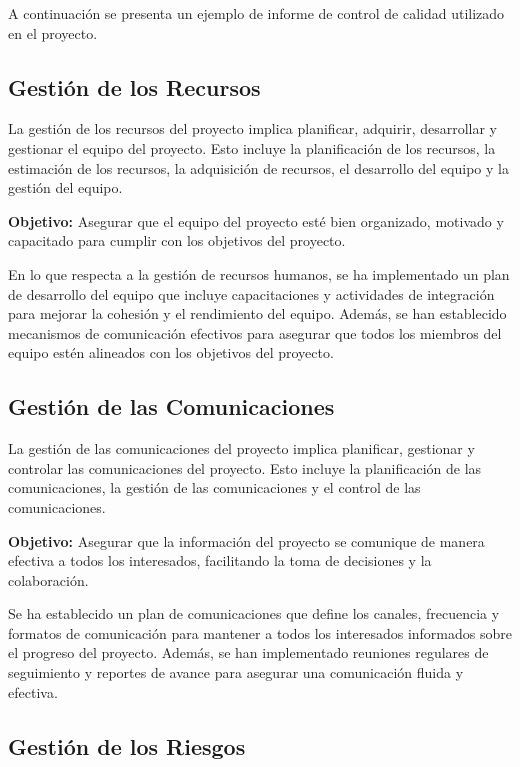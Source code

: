     A continuación se presenta un ejemplo de informe de control de calidad utilizado en el proyecto.

    

    \subsection{Gestión de los Recursos}

    La gestión de los recursos del proyecto implica planificar, adquirir, desarrollar y gestionar el equipo del proyecto. Esto incluye la planificación de los recursos, la estimación de los recursos, la adquisición de recursos, el desarrollo del equipo y la gestión del equipo.

    \textbf{Objetivo:} Asegurar que el equipo del proyecto esté bien organizado, motivado y capacitado para cumplir con los objetivos del proyecto.

    
    En lo que respecta a la gestión de recursos humanos, se ha implementado un plan de desarrollo del equipo que incluye capacitaciones y actividades de integración para mejorar la cohesión y el rendimiento del equipo. Además, se han establecido mecanismos de comunicación efectivos para asegurar que todos los miembros del equipo estén alineados con los objetivos del proyecto.

    \subsection{Gestión de las Comunicaciones}

    La gestión de las comunicaciones del proyecto implica planificar, gestionar y controlar las comunicaciones del proyecto. Esto incluye la planificación de las comunicaciones, la gestión de las comunicaciones y el control de las comunicaciones.

    \textbf{Objetivo:} Asegurar que la información del proyecto se comunique de manera efectiva a todos los interesados, facilitando la toma de decisiones y la colaboración.

    Se ha establecido un plan de comunicaciones que define los canales, frecuencia y formatos de comunicación para mantener a todos los interesados informados sobre el progreso del proyecto. Además, se han implementado reuniones regulares de seguimiento y reportes de avance para asegurar una comunicación fluida y efectiva.

    \subsection{Gestión de los Riesgos}

